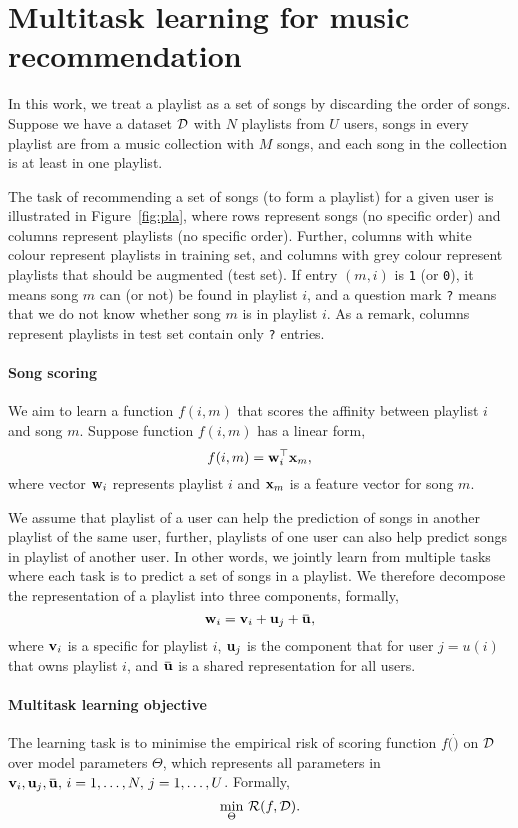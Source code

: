 \section{Multitask learning for music recommendation}

In this work, we treat a playlist as a set of songs by discarding the order of songs.
Suppose we have a dataset $\mathcal{D}$ with $N$ playlists from $U$ users, songs in every playlist are from a music collection 
with $M$ songs, and each song in the collection is at least in one playlist.

The task of recommending a set of songs (to form a playlist) for a given user is illustrated in Figure~\ref{fig:pla},
where rows represent songs (no specific order) and columns represent playlists (no specific order).
Further, columns with white colour represent playlists in training set, 
and columns with grey colour represent playlists that should be augmented (\ie test set).
If entry $(m, i)$ is \texttt{1} (or \texttt{0}), 
it means song $m$ can (or not) be found in playlist $i$,
and a question mark \texttt{?} means that we do not know whether song $m$ is in playlist $i$.
As a remark, columns represent playlists in test set contain only \texttt{?} entries.




\paragraph{Song scoring}
%
We aim to learn a function $f(i, m)$ that scores the affinity between playlist $i$ and song $m$.
Suppose function $f(i, m)$ has a linear form, \ie
$$
f(i, m) = \mathbf{w}_i^\top \mathbf{x}_m,
$$
where vector $\mathbf{w}_i$ represents playlist $i$ and $\mathbf{x}_m$ is a feature vector for song $m$.

We assume that playlist of a user can help the prediction of songs in another playlist of the same user,
further, playlists of one user can also help predict songs in playlist of another user.
In other words, we jointly learn from multiple tasks where each task is to predict a set of songs in a playlist.
We therefore decompose the representation of a playlist into three components, formally,
$$
\w_i = \bv_i + \bu_j + \widebar\bu,
$$
where $\mathbf{v}_i$ is a specific for playlist $i$, $\mathbf{u}_j$ is the component that for user $j=u(i)$ that owns playlist $i$,
and $\widebar\bu$ is a shared representation for all users.


\paragraph{Multitask learning objective}
%
The learning task is to minimise the empirical risk of scoring function $f(\dot)$ on $\mathcal{D}$ over model parameters $\Theta$,
which represents all parameters in $\bv_i, \bu_j, \widebar\bu, \, i=1,\dots,N, \, j=1,\dots,U$.
Formally,
$$
\min_{\Theta} \, \mathcal{R}(f, \mathcal{D}).
$$

